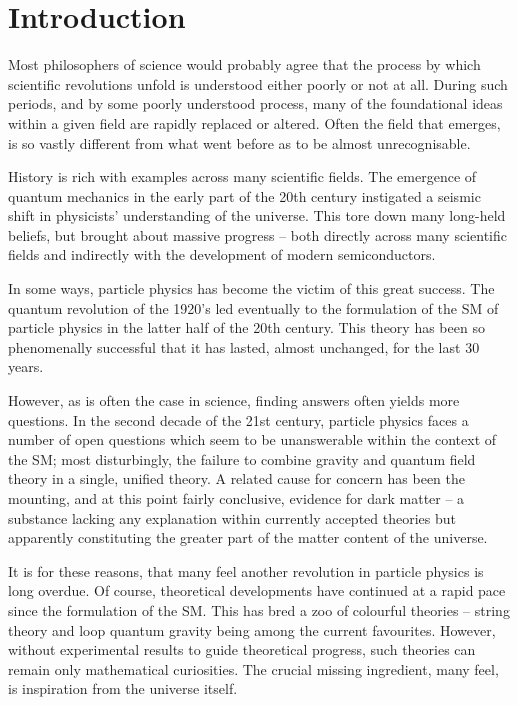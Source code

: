 \chapter*{Introduction}

Most philosophers of science would probably agree that the process by which
scientific revolutions unfold is understood either poorly or not at all. During
such periods, and by some poorly understood process, many of the foundational
ideas within a given field are rapidly replaced or altered. Often the field that
emerges, is so vastly different from what went before as to be almost
unrecognisable.

History is rich with examples across many scientific fields. The emergence of
quantum mechanics in the early part of the 20th century instigated a seismic
shift in physicists' understanding of the universe. This tore down many
long-held beliefs, but brought about massive progress -- both directly across
many scientific fields and indirectly with the development of modern
semiconductors.

In some ways, particle physics has become the victim of this great success. The
quantum revolution of the 1920's led eventually to the formulation of the
\acl{SM} of particle physics in the latter half of the 20th century. This theory
has been so phenomenally successful that it has lasted, almost unchanged, for
the last 30 years.

However, as is often the case in science, finding answers often yields more
questions. In the second decade of the 21st century, particle physics faces a
number of open questions which seem to be unanswerable within the context of the
\ac{SM}; most disturbingly, the failure to combine gravity and quantum field
theory in a single, unified theory. A related cause for concern has been the
mounting, and at this point fairly conclusive, evidence for dark matter -- a
substance lacking any explanation within currently accepted theories but
apparently constituting the greater part of the matter content of the
universe.

It is for these reasons, that many feel another revolution in particle physics
is long overdue. Of course, theoretical developments have continued at a rapid
pace since the formulation of the \ac{SM}. This has bred a zoo of colourful
theories -- string theory and loop quantum gravity being among the current
favourites. However, without experimental results to guide theoretical progress,
such theories can remain only mathematical curiosities. The crucial missing
ingredient, many feel, is inspiration from the universe itself.

